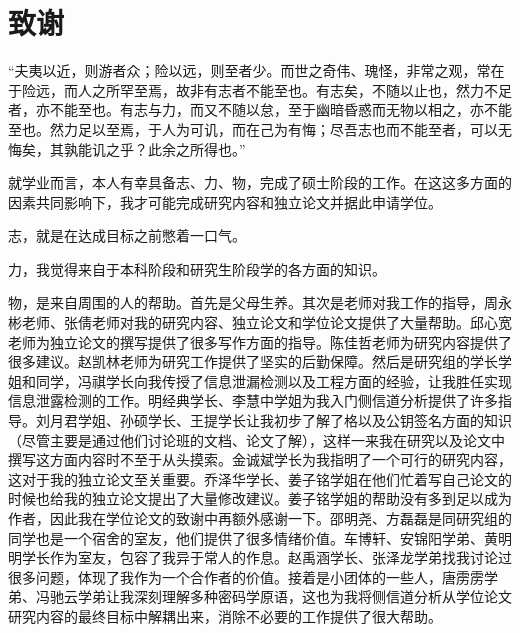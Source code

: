 \chapter[致谢]{致\quad 谢}%

“夫夷以近，则游者众；险以远，则至者少。而世之奇伟、瑰怪，非常之观，常在于险远，而人之所罕至焉，故非有志者不能至也。有志矣，不随以止也，然力不足者，亦不能至也。有志与力，而又不随以怠，至于幽暗昏惑而无物以相之，亦不能至也。然力足以至焉，于人为可讥，而在己为有悔；尽吾志也而不能至者，可以无悔矣，其孰能讥之乎？此余之所得也。”

就学业而言，本人有幸具备志、力、物，完成了硕士阶段的工作。在这这多方面的因素共同影响下，我才可能完成研究内容和独立论文并据此申请学位。

志，就是在达成目标之前憋着一口气。

力，我觉得来自于本科阶段和研究生阶段学的各方面的知识。

物，是来自周围的人的帮助。首先是父母生养。其次是老师对我工作的指导，周永彬老师、张倩老师对我的研究内容、独立论文和学位论文提供了大量帮助。邱心宽老师为独立论文的撰写提供了很多写作方面的指导。陈佳哲老师为研究内容提供了很多建议。赵凯林老师为研究工作提供了坚实的后勤保障。然后是研究组的学长学姐和同学，冯祺学长向我传授了信息泄漏检测以及工程方面的经验，让我胜任实现信息泄露检测的工作。明经典学长、李慧中学姐为我入门侧信道分析提供了许多指导。刘月君学姐、孙硕学长、王提学长让我初步了解了格以及公钥签名方面的知识（尽管主要是通过他们讨论班的文档、论文了解），这样一来我在研究以及论文中撰写这方面内容时不至于从头摸索。金诚斌学长为我指明了一个可行的研究内容，这对于我的独立论文至关重要。乔泽华学长、姜子铭学姐在他们忙着写自己论文的时候也给我的独立论文提出了大量修改建议。姜子铭学姐的帮助没有多到足以成为作者，因此我在学位论文的致谢中再额外感谢一下。邵明尧、方磊磊是同研究组的同学也是一个宿舍的室友，他们提供了很多情绪价值。车博轩、安锦阳学弟、黄明明学长作为室友，包容了我异于常人的作息。赵禹涵学长、张泽龙学弟找我讨论过很多问题，体现了我作为一个合作者的价值。接着是小团体的一些人，唐雳雳学弟、冯驰云学弟让我深刻理解多种密码学原语，这也为我将侧信道分析从学位论文研究内容的最终目标中解耦出来，消除不必要的工作提供了很大帮助。


